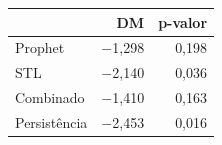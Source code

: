\begin{tabular}{lrr}
\toprule
 & DM & p-valor \\
\midrule
Prophet & $-$1,298 & 0,198 \\
STL & $-$2,140 & 0,036 \\
Combinado & $-$1,410 & 0,163 \\
Persistência & $-$2,453 & 0,016 \\
\bottomrule
\end{tabular}
